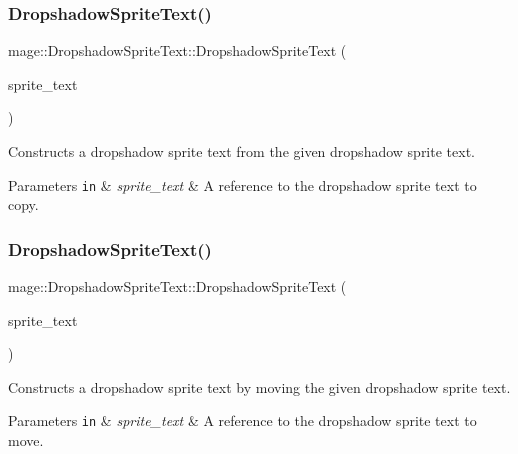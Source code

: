 \subsubsection{\texorpdfstring{Dropshadow\+Sprite\+Text()}{DropshadowSpriteText()}\hspace{0.1cm}{\footnotesize\ttfamily [3/4]}}
{\footnotesize\ttfamily mage\+::\+Dropshadow\+Sprite\+Text\+::\+Dropshadow\+Sprite\+Text (\begin{DoxyParamCaption}\item[{const \hyperlink{classmage_1_1_dropshadow_sprite_text}{Dropshadow\+Sprite\+Text} \&}]{sprite\+\_\+text }\end{DoxyParamCaption})\hspace{0.3cm}{\ttfamily [default]}}

Constructs a dropshadow sprite text from the given dropshadow sprite text.


\begin{DoxyParams}[1]{Parameters}
\mbox{\tt in}  & {\em sprite\+\_\+text} & A reference to the dropshadow sprite text to copy. \\
\hline
\end{DoxyParams}
\hypertarget{classmage_1_1_dropshadow_sprite_text_a238b873f7b4d818cc3640e8f363f760e}{}\label{classmage_1_1_dropshadow_sprite_text_a238b873f7b4d818cc3640e8f363f760e} 
\subsubsection{\texorpdfstring{Dropshadow\+Sprite\+Text()}{DropshadowSpriteText()}\hspace{0.1cm}{\footnotesize\ttfamily [4/4]}}
{\footnotesize\ttfamily mage\+::\+Dropshadow\+Sprite\+Text\+::\+Dropshadow\+Sprite\+Text (\begin{DoxyParamCaption}\item[{\hyperlink{classmage_1_1_dropshadow_sprite_text}{Dropshadow\+Sprite\+Text} \&\&}]{sprite\+\_\+text }\end{DoxyParamCaption})\hspace{0.3cm}{\ttfamily [default]}}

Constructs a dropshadow sprite text by moving the given dropshadow sprite text.


\begin{DoxyParams}[1]{Parameters}
\mbox{\tt in}  & {\em sprite\+\_\+text} & A reference to the dropshadow sprite text to move. \\
\hline
\end{DoxyParams}
\hypertarget{classmage_1_1_dropshadow_sprite_text_a561b1be59d05bccb680969be792c0e28}{}\label{classmage_1_1_dropshadow_sprite_text_a561b1be59d05bccb680969be792c0e28} 
